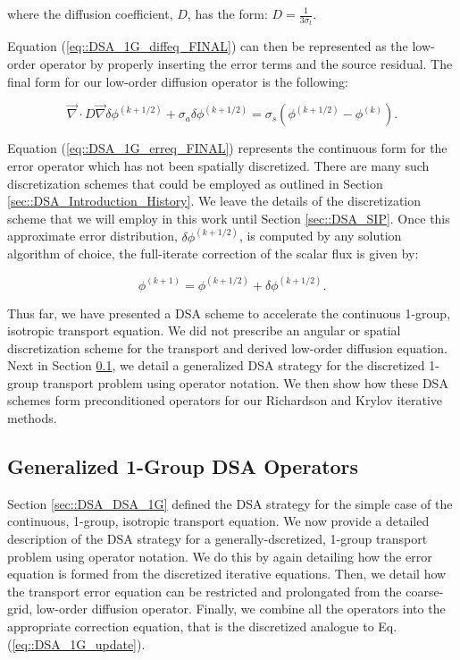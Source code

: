\noindent where the diffusion coefficient, $D$, has the form: $D = \frac{1}{3 \sigma_t}$. 

Equation (\ref{eq::DSA_1G_diffeq_FINAL}) can then be represented as the low-order operator by properly inserting the error terms and the source residual. The final form for our low-order diffusion operator is the following:

\begin{equation}
\label{eq::DSA_1G_erreq_FINAL}
\vec{\nabla} \cdot D \vec{\nabla} \delta \phi^{(k+1/2)} + \sigma_a \delta \phi^{(k+1/2)} = \sigma_s \left( \phi^{(k+1/2)} -  \phi^{(k)}\right)  .
\end{equation}

\noindent Equation (\ref{eq::DSA_1G_erreq_FINAL}) represents the continuous form for the error operator which has not been spatially discretized. There are many such discretization schemes that could be employed as outlined in Section \ref{sec::DSA_Introduction_History}. We leave the details of the discretization scheme that we will employ in this work until Section \ref{sec::DSA_SIP}. Once this approximate error distribution, $\delta \phi^{(k+1/2)}$, is computed by any solution algorithm of choice, the full-iterate correction of the scalar flux is given by:

\begin{equation}
\label{eq::DSA_1G_update}
 \phi^{(k+1)} =  \phi^{(k+1/2)} + \delta \phi^{(k+1/2)} .
\end{equation}

\noindent Thus far, we have presented a DSA scheme to accelerate the continuous 1-group, isotropic transport equation. We did not prescribe an angular or spatial discretization scheme for the transport and derived low-order diffusion equation. Next in Section \ref{sec::DSA_DSA_Operator}, we detail a generalized DSA strategy for the discretized 1-group transport problem using operator notation. We then show how these DSA schemes form preconditioned operators for our Richardson and Krylov iterative methods.

\subsection{Generalized 1-Group DSA Operators}
\label{sec::DSA_DSA_Operator}

Section \ref{sec::DSA_DSA_1G} defined the DSA strategy for the simple case of the continuous, 1-group, isotropic transport equation. We now provide a detailed description of the DSA strategy for a generally-dscretized, 1-group transport problem using operator notation. We do this by again detailing how the error equation is formed from the discretized iterative equations. Then, we detail how the transport error equation can be restricted and prolongated from the coarse-grid, low-order diffusion operator. Finally, we combine all the operators into the appropriate correction equation, that is the discretized analogue to Eq. (\ref{eq::DSA_1G_update}).

